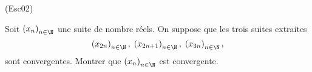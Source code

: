 \begin{tiny}(Esc02)\end{tiny} Soit $\left( x_n\right)_{n\in \N}$ une suite de nombre réels. On suppose que les trois suites extraites
\begin{displaymath}
  \left( x_{2n}\right)_{n\in \N}, \;\left( x_{2n+1}\right)_{n\in \N}, \;\left( x_{3n}\right)_{n\in \N},
\end{displaymath}
sont convergentes. Montrer que $\left( x_{n}\right)_{n\in \N}$ est convergente.
